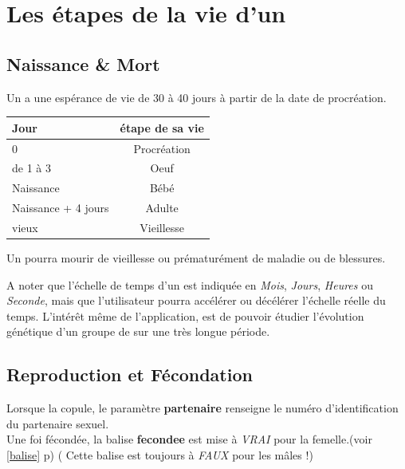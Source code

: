 \documentclass[french]{report}
\begin{document}
\section{Les étapes de la vie d'un \CoCiX}
\subsection{Naissance \& Mort}
Un \CoCiX a une espérance de vie de 30 à 40 jours à partir de la date de procréation.

\begin{center}
	\begin{tabular}{|l| c|} \hline
		\textbf{Jour} & \textbf{étape de sa vie}\\ \hline
		0 & Procréation\\
		de 1 à 3 & Oeuf\\
		Naissance & Bébé\\
		Naissance + 4 jours & Adulte\\ 
		vieux\footnotemark[1] & Vieillesse\\ \hline
	\end{tabular}
\end{center}
Un \CoCiX pourra mourir de vieillesse ou prématurément de maladie ou de blessures.

A noter que l'échelle de temps d'un \CoCiX est indiquée en \textit{Mois}, \textit{Jours}, \textit{Heures} ou \textit{Seconde}, mais que l'utilisateur pourra accélérer ou décélérer l'échelle réelle du temps. L'intérêt même de l'application, est de pouvoir étudier l'évolution génétique d'un groupe de \CoCiX sur une très longue période.



\subsection{Reproduction et Fécondation}\label{fecondee}
Lorsque la \CoCiX copule, le paramètre \textbf{partenaire} renseigne le numéro d'identification du partenaire sexuel.\\

Une foi fécondée, la balise \textbf{fecondee} est mise à \textit{VRAI} pour la femelle.(voir \ref{balise} p\pageref{balise})
( Cette balise est toujours à \textit{FAUX} pour les \CoCiX mâles !) \\
\end{document}
